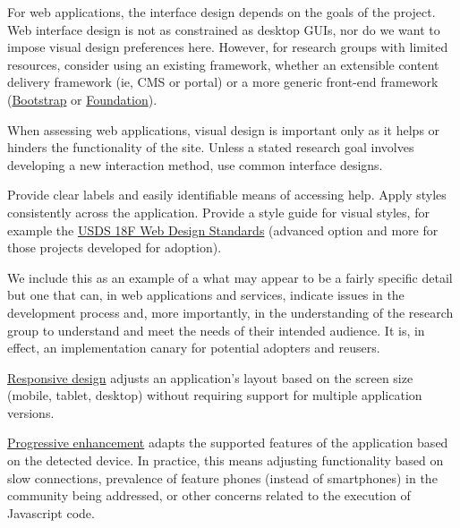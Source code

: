 \documentclass{article}
\newcounter{subsubsubsection}[subsubsection]
\begin{document}
For web applications, the interface design depends on the goals of the project. Web interface design is not as constrained as desktop GUIs, nor do we want to impose visual design preferences here. However, for research groups with limited resources, consider using an existing framework, whether an extensible content delivery framework (ie, CMS or portal) or a more generic front-end framework (\href{http://getbootstrap.com/} {Bootstrap} or \href{http://foundation.zurb.com/} {Foundation}). 
 
When assessing web applications, visual design is important only as it helps or hinders the functionality of the site. Unless a stated research goal involves developing a new interaction method, use common interface designs.
 
Provide clear labels and easily identifiable means of accessing help. Apply styles consistently across the application. Provide a style guide for visual styles, for example the \href{https://standards.usa.gov/} {USDS 18F Web Design Standards} (advanced option and more for those projects developed for adoption). 

We include this as an example of a what may appear to be a fairly specific detail but one that can, in web applications and services, indicate issues in the development process and, more importantly, in the understanding of the research group to understand and meet the needs of their intended audience. It is, in effect, an implementation canary for potential adopters and reusers.

\href{http://alistapart.com/article/responsive-web-design} {Responsive design} adjusts an application’s layout based on the screen size (mobile, tablet, desktop) without requiring support for multiple application versions.

\href{https://www.w3.org/wiki/Graceful_degradation_versus_progressive_enhancement} {Progressive enhancement} adapts the supported features of the application based on the detected device. In practice, this means adjusting functionality based on slow connections, prevalence of feature phones (instead of smartphones) in the community being addressed, or other concerns related to the execution of Javascript code.
 
\end{document}
